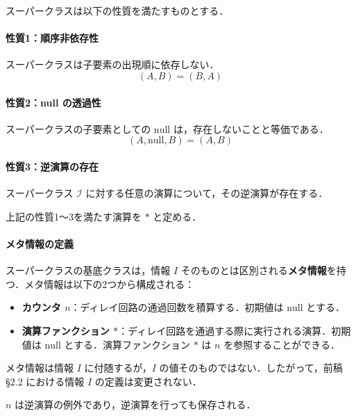 \documentclass[12pt,a4paper]{ltjsarticle}
\begin{document}
スーパークラスは以下の性質を満たすものとする．

\paragraph{性質1：順序非依存性}

スーパークラスは子要素の出現順に依存しない．
\begin{equation}
(A, B) = (B, A)
\end{equation}

\paragraph{性質2：null の透過性}

スーパークラスの子要素としての $\mathrm{null}$ は，存在しないことと等価である．
\begin{equation}
(A, \mathrm{null}, B) = (A, B)
\end{equation}

\paragraph{性質3：逆演算の存在}

スーパークラス $\mathcal{I}$ に対する任意の演算について，その逆演算が存在する．

上記の性質1〜3を満たす演算を $*$ と定める．

\paragraph{メタ情報の定義}

スーパークラスの基底クラスは，情報 $I$ そのものとは区別される\textbf{メタ情報}を持つ．メタ情報は以下の2つから構成される：

\begin{itemize}
  \item \textbf{カウンタ $n$}：ディレイ回路の通過回数を積算する．初期値は $\mathrm{null}$ とする．
  \item \textbf{演算ファンクション $*$}：ディレイ回路を通過する際に実行される演算．初期値は $\mathrm{null}$ とする．演算ファンクション $*$ は $n$ を参照することができる．
\end{itemize}

メタ情報は情報 $I$ に付随するが，$I$ の値そのものではない．したがって，前稿~\cite{ref1} \S 2.2 における情報 $I$ の定義は変更されない．

$n$ は逆演算の例外であり，逆演算を行っても保存される．
\end{document}
